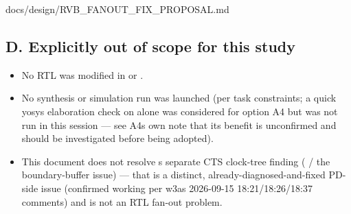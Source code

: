 \begin{relocated}{docs/design/RVB_FANOUT_FIX_PROPOSAL.md}
\subsection{D. Explicitly out of scope for this study}\label{tm:pd:rvb-fanout-fix:d-explicitly-out-of-scope-for-this-study}

\begin{itemize}
\tightlist
\item
  No RTL was modified in  or .
\item
  No synthesis or simulation run was launched (per task constraints; a
  quick yosys elaboration check on  alone was
  considered for option A4 but was not run in this session --- see
  A4\textquotesingle s own note that its benefit is unconfirmed and
  should be investigated before being adopted).
\item
  This document does not resolve \textquotesingle s separate
  CTS clock-tree finding ( / the
   boundary-buffer issue) --- that is a distinct,
  already-diagnosed-and-fixed PD-side issue (confirmed working per
  w3a\textquotesingle s 2026-09-15
  18:21/\allowbreak{}18:26/\allowbreak{}18:37 comments) and is not an
  RTL fan-out problem.
\end{itemize}
\end{relocated}

